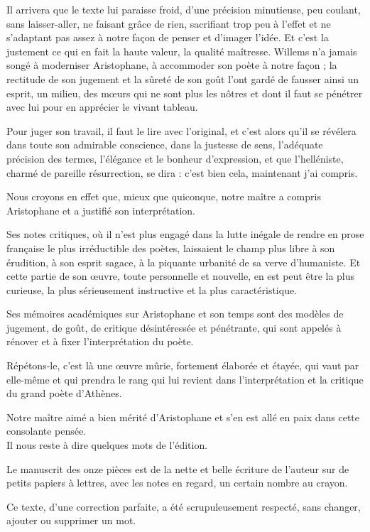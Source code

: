 \documentclass{book}%
\begin{document}
Il arrivera que le texte lui paraisse froid, d'une précision minutieuse, peu coulant, sans laisser-aller, ne faisant grâce de rien, sacrifiant trop peu à l'effet et ne s'adaptant pas assez à notre façon de penser et d'imager l'idée. Et c'est la justement ce qui en fait la haute valeur, la qualité maîtresse. Willems n'a jamais songé à moderniser Aristophane, à accommoder son poète à notre façon ; la rectitude de son jugement et la sûreté de son goût l'ont gardé de fausser ainsi un esprit, un milieu, des mœurs qui ne sont plus les nôtres et dont il faut se pénétrer avec lui pour en apprécier le vivant tableau. 

Pour juger son travail, il faut le lire avec l'original, et c'est alors qu'il se révélera dans toute son admirable conscience, dans la justesse de sens, l'adéquate précision des termes, l'élégance et le bonheur d'expression, et que l'helléniste, charmé de pareille résurrection, se dira : c'est bien cela, maintenant j'ai compris. 

Nous croyons en effet que, mieux que quiconque, notre maître a compris Aristophane et a justifié son interprétation. 

Ses notes critiques, où il n'est plus engagé dans la lutte inégale de rendre en prose française le plus irréductible des poètes, laissaient le champ plus libre à son érudition, à son esprit sagace, à la piquante urbanité de sa verve d'humaniste. Et cette partie de son œuvre, toute personnelle et nouvelle, en est peut être la plus curieuse, la plus sérieusement instructive et la plus caractéristique. 

Ses mémoires académiques sur Aristophane et son temps sont des modèles de jugement, de goût, de critique désintéressée et pénétrante, qui sont appelés à rénover et à fixer l'interprétation du poète. 

Répétons-le, c'est là une œuvre mûrie, fortement élaborée et étayée, qui vaut par elle-même et qui prendra le rang qui lui revient dans l'interprétation et la critique du grand poète d'Athènes. 

Notre maître aimé a bien mérité d'Aristophane et s'en est allé en paix dans cette consolante pensée. \\


Il nous reste à dire quelques mots de l'édition. 

Le manuscrit des onze pièces est de la nette et belle écriture de l'auteur sur de petits papiers à lettres, avec les notes en regard, un certain nombre au crayon. 

Ce texte, d'une correction parfaite, a été scrupuleusement respecté, sans changer, ajouter ou supprimer un mot. \\
\end{document}

